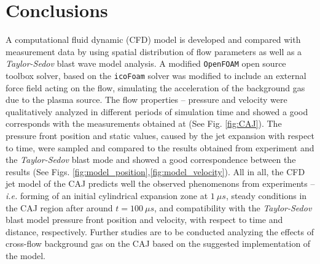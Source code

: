 \documentclass[a4paper]{iacas}%
\begin{document}
\section{Conclusions}
A computational fluid dynamic (CFD) model is developed and compared with measurement data by using spatial distribution of flow parameters as well as a \emph{Taylor-Sedov} blast wave model analysis.
A modified \texttt{OpenFOAM} open source toolbox solver, based on the \texttt{icoFoam} solver was modified to include an external force field acting on the flow, simulating the acceleration of the background gas due to the plasma source.
The flow properties -- pressure and velocity were qualitatively analyzed in different periods of simulation time and showed a good corresponds with the measurements obtained at \cite{KR,KRClose,KRFar} (See Fig. \ref{fig:CAJ}). The pressure front position and static values, caused by the jet expansion with respect to time, were sampled and compared to the results obtained from experiment and the \emph{Taylor-Sedov} blast mode and showed a good correspondence between the results (See Figs. \ref{fig:model_position},\ref{fig:model_velocity}).
All in all, the CFD jet model of the CAJ predicts well the observed phenomenons from experiments -- \emph{i.e.} forming of an initial cylindrical expansion zone at $1~\mu s$, steady conditions in the CAJ region after around $t = 100~\mu s$, and compatibility with the \emph{Taylor-Sedov} blast model pressure front position and velocity, with respect to time and distance, respectively. Further studies are to be conducted analyzing the effects of cross-flow background gas \cite{KRClose} on the CAJ based on the suggested implementation of the model.

\clearpage


\end{document}
